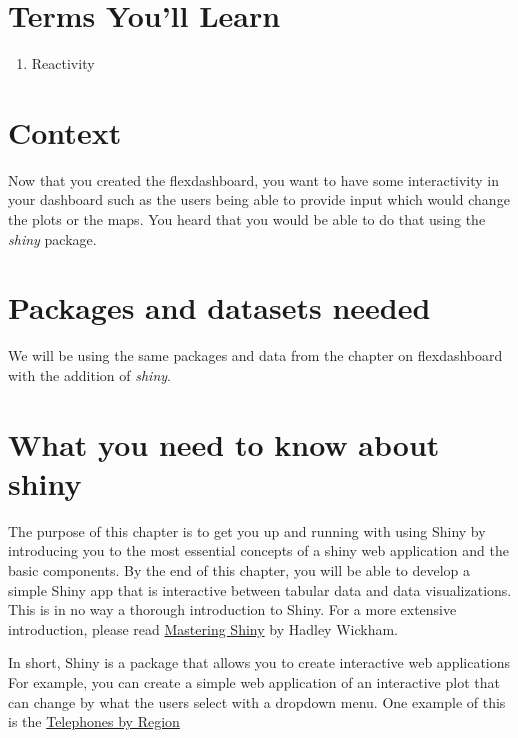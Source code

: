 \documentclass[
  krantz2]{krantz}
\providecommand{\tightlist}{%
  \setlength{\itemsep}{0pt}\setlength{\parskip}{0pt}}
\begin{document}
\hypertarget{shiny-terms}{%
\section{Terms You'll Learn}\label{shiny-terms}}

\begin{enumerate}
\def\labelenumi{\arabic{enumi}.}
\tightlist
\item
  Reactivity
\end{enumerate}

\hypertarget{shiny-scenario}{%
\section{Context}\label{shiny-scenario}}

Now that you created the flexdashboard, you want to have some interactivity in your dashboard such as the users being able to provide input which would change the plots or the maps. You heard that you would be able to do that using the \emph{shiny} package.

\hypertarget{shiny-pkgs}{%
\section{Packages and datasets needed}\label{shiny-pkgs}}

We will be using the same packages and data from the chapter on flexdashboard with the addition of \emph{shiny}.

\hypertarget{shiny-intro}{%
\section{What you need to know about shiny}\label{shiny-intro}}

The purpose of this chapter is to get you up and running with using Shiny by introducing you to the most essential concepts of a shiny web application and the basic components. By the end of this chapter, you will be able to develop a simple Shiny app that is interactive between tabular data and data visualizations. This is in no way a thorough introduction to Shiny. For a more extensive introduction, please read \href{https://mastering-shiny.org/basic-app.html}{Mastering Shiny} by Hadley Wickham.

In short, Shiny is a package that allows you to create interactive web applications For example, you can create a simple web application of an interactive plot that can change by what the users select with a dropdown menu. One example of this is the \href{https://shiny.rstudio.com/gallery/telephones-by-region.html}{Telephones by Region}
\end{document}

